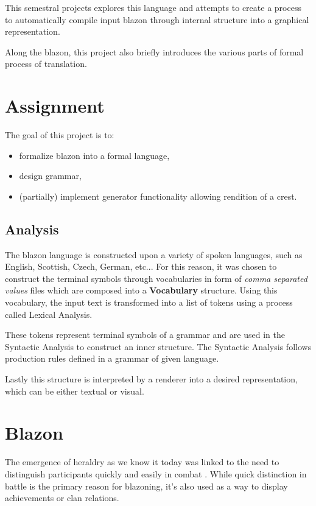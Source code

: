 \documentclass[12pt,a4paper]{article}
\let\oldsection\section
\renewcommand\section{\clearpage\oldsection}
\begin{document}
This semestral projects explores this language and attempts to create a process to automatically compile input blazon through internal structure into a graphical representation.

Along the blazon, this project also briefly introduces the various parts of formal process of translation.

\section{Assignment}
The goal of this project is to:
\begin{itemize}
\setlength\itemsep{-0.5em}
\item formalize blazon into a formal language,
\item design grammar,
\item (partially) implement generator functionality allowing rendition of a crest.
\end{itemize}

\subsection{Analysis}
The blazon language is constructed upon a variety of spoken languages, such as English, Scottish, Czech, German, etc...
For this reason, it was chosen to construct the terminal symbols through vocabularies in form of \textit{comma separated values} files which are composed into a \textbf{Vocabulary} structure.
Using this vocabulary, the input text is transformed into a list of tokens using a process called Lexical Analysis.

These tokens represent terminal symbols of a grammar and are used in the Syntactic Analysis to construct an inner structure.
The Syntactic Analysis follows production rules defined in a grammar of given language.

Lastly this structure is interpreted by a renderer into a desired representation, which can be either textual or visual.

\section{Blazon}
The emergence of heraldry as we know it today was linked to the need to distinguish participants quickly and easily in combat \cite{InternationalHeraldry}.
While quick distinction in battle is the primary reason for blazoning, it's also used as a way to display achievements or clan relations.
\end{document}
